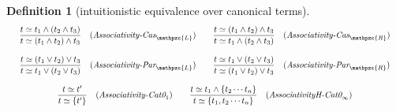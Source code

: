 \documentclass[12pt]{article}
\newtheorem{Definition}{Definition}[section]
\begin{document}
\begin{Definition}[intuitionistic equivalence over canonical terms]
\begin{displaymath}
\begin{array}{c}
      \begin{array}{ll}
        \begin{array}{rl}
          \dfrac{ t \simeq t_1 \wedge (t_2 \wedge t_3) }{
            t \simeq (t_1 \wedge t_2) \wedge t_3
          }  &  (\text{\it Associativity-Cas}_{\mathpzc{L}})
        \end{array}
        
        & \begin{array}{rl}
            \dfrac{t \simeq (t_1 \wedge t_2) \wedge t_3 }{
              t \simeq  t_1 \wedge (t_2 \wedge t_3)
            }  &  (\text{\it Associativity-Cas}_{\mathpzc{R}})
          \end{array}  \\
      \end{array}  \\
      \\
      
      \begin{array}{ll}
        \begin{array}{rl}
          \dfrac{ t \simeq (t_1 \vee t_2) \vee t_3 }{
            t \simeq t_1 \vee (t_2 \vee t_3)
          }  &  (\text{\it Associativity-Par}_{\mathpzc{L}})
        \end{array}      
        & \begin{array}{rl}
            \dfrac{t \simeq t_1 \vee (t_2 \vee t_3) }{
              t \simeq (t_1 \vee t_2) \vee t_3
            }  &  (\text{\it Associativity-Par}_{\mathpzc{R}})
          \end{array}
      \end{array}  \\
      \\
            
      \begin{array}{rl}
        \begin{array}{rl}
          \dfrac{ t \simeq t' }{ t \simeq \{t'\} }
          & (\text{\it Associativity-Cat0}_1)
        \end{array}
        & \begin{array}{rl}
            \dfrac{
              t \simeq t_1 \wedge \{t_2 \cdots t_n \}
            }{
              t \simeq \{t_1, t_2 \cdots t_n \}
            }  &  (\text{\it AssociativityH-Cat0}_\infty)
          \end{array}
      \end{array}  \\
      \\
      

\end{array}
\end{displaymath}
\end{Definition}
\end{document}
